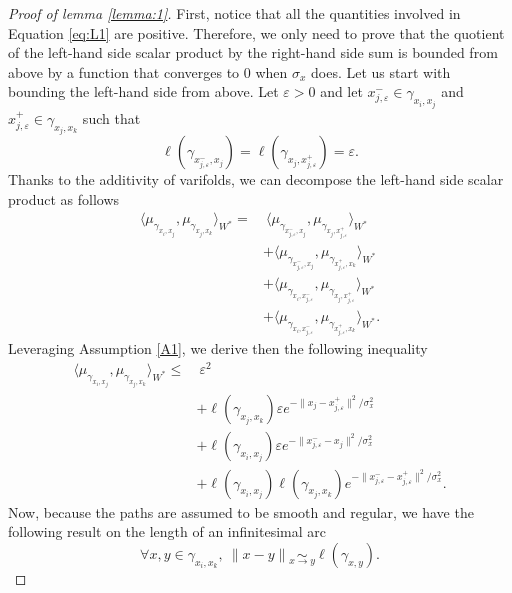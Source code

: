 \documentclass[pdflatex,sn-mathphys-num]{sn-jnl}%
\theoremstyle{thmstyleone}%
\theoremstyle{thmstyletwo}%
\theoremstyle{thmstylethree}%
\begin{document}
\begin{appendices}
\begin{proof}[Proof of lemma \ref{lemma:1}]
First, notice that all the quantities involved in Equation \ref{eq:L1} are positive. Therefore, we only need to prove that the quotient of the left-hand side scalar product by the right-hand side sum is bounded from above by a function that converges to $0$ when $\sigma_x$ does. 
\medbreak 
Let us start with bounding the left-hand side from above. Let $\varepsilon > 0$ and let $x_{j, \varepsilon}^- \in \gamma_{x_i, x_j}$ and $x_{j, \varepsilon}^+ \in \gamma_{x_j, x_k}$ such that
\begin{equation*}
    \ell(\gamma_{x_{j, \varepsilon}^-, x_j})=\ell(\gamma_{x_j, x_{j, \varepsilon}^+}) = \varepsilon.
\end{equation*} 
Thanks to the additivity of varifolds, we can decompose the left-hand side scalar product as follows 
\begin{align*}
    \langle \mu_{\gamma_{x_i, x_j}}, \mu_{\gamma_{x_j, x_k}} \rangle_{W^\ast} 
    = &\: \langle \mu_{\gamma_{x_{j, \varepsilon}^-, x_j}} , \mu_{\gamma_{x_j, x_{j, \varepsilon}^+}} \rangle_{W^\ast} \\
    &+ \langle \mu_{\gamma_{x_{j, \varepsilon}^-, x_j}} , \mu_{\gamma_{x_{j, \varepsilon}^+, x_k}} \rangle_{W^\ast} \\
    &+ \langle \mu_{\gamma_{x_i, x_{j, \varepsilon}^-}}, \mu_{\gamma_{x_j, x_{j, \varepsilon}^+}} \rangle_{W^\ast} \\
    &+ \langle \mu_{\gamma_{x_i, x_{j, \varepsilon}^-}}, \mu_{\gamma_{x_{j, \varepsilon}^+, x_k}} \rangle_{W^\ast}.
\end{align*}
Leveraging Assumption \ref{A1}, we derive then the following inequality 
\begin{align*}
    \langle \mu_{\gamma_{x_i, x_j}}, \mu_{\gamma_{x_j, x_k}} \rangle_{W^\ast} 
    \leq &\: \varepsilon^2 \\
    &+ \ell(\gamma_{x_j, x_k}) \varepsilon e^{-\|x_j - x_{j, \varepsilon}^+\|^2 / \sigma_x^2} \\
    &+ \ell(\gamma_{x_i, x_j}) \varepsilon e^{-\|x_{j, \varepsilon}^- - x_j\|^2 / \sigma_x^2} \\
    &+ \ell(\gamma_{x_i, x_j}) \ell(\gamma_{x_j, x_k}) e^{-\|x_{j, \varepsilon}^- - x_{j, \varepsilon}^+\|^2 / \sigma_x^2}.
\end{align*}
Now, because the paths are assumed to be smooth and regular, we have the following result on the length of an infinitesimal arc
\begin{equation*}
    \forall x,y \in \gamma_{x_i, x_k}, \: \|x -y\| \underset{x \to y}{\sim} \ell(\gamma_{x, y}).

\end{equation*}
\end{proof}
\end{appendices}
\end{document}
